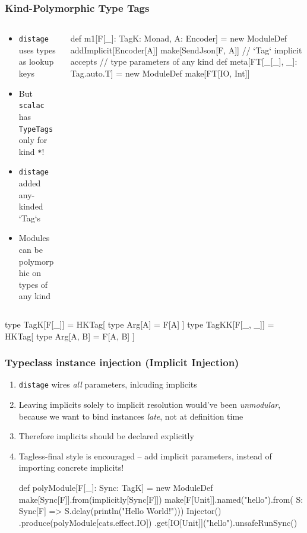 \documentclass[usenames,dvipsnames]{beamer}
\newcommand{\distage}{\texttt{distage}\xspace}
\begin{document}
\begin{frame}[fragile]
\frametitle{Kind-Polymorphic Type Tags}
\begin{columns}

\begin{column}[T]{0.4\textwidth}
   \setlength{\topsep}{0pt}
   \setlength{\partopsep}{0pt}
\begin{itemize}
\item \distage uses types as lookup keys
\item But \texttt{scalac} has \texttt{TypeTags} only for kind \texttt{*}!
\item \distage added any-kinded `Tag`s
\item Modules can be polymorphic on types of any kind
\end{itemize}
\end{column}

\begin{column}[T]{0.6\textwidth}
\begin{scalacode}
def m1[F[_]: TagK: Monad, A: Encoder]
  = new ModuleDef {
      addImplicit[Encoder[A]]
      make[SendJson[F, A]]
    }
// `Tag` implicit accepts 
// type parameters of any kind
def meta[FT[_[_], _]: Tag.auto.T] = 
  new ModuleDef {
    make[FT[IO, Int]]
  }
\end{scalacode}
\end{column}

\end{columns}
\begin{scalacode}
type TagK[F[_]] = HKTag[{ type Arg[A] = F[A] }]
type TagKK[F[_, _]] = HKTag[{ type Arg[A, B] = F[A, B] }]
\end{scalacode}
\end{frame}

\begin{frame}[fragile]
\frametitle{Typeclass instance injection (Implicit Injection)}
\begin{enumerate}
\item \distage wires \textit{all} parameters, inlcuding implicits
\item Leaving implicits solely to implicit resolution would've been \textit{unmodular},
because we want to bind instances \textit{late}, not at definition time
\item Therefore implicits should be declared explicitly
\item Tagless-final style is encouraged – add implicit parameters, instead of importing concrete implicits!
\begin{scalacode}
def polyModule[F[_]: Sync: TagK] = new ModuleDef {
  make[Sync[F]].from(implicitly[Sync[F]])
  make[F[Unit]].named("hello").from(
    S: Sync[F] => S.delay(println("Hello World!")))
}
Injector()
  .produce(polyModule[cats.effect.IO])
  .get[IO[Unit]]("hello").unsafeRunSync()
\end{scalacode}
\end{enumerate}
\end{frame}
\end{document}
